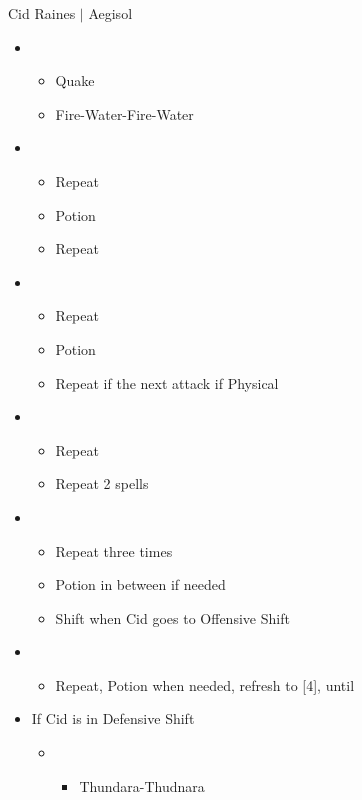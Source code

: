 \begin{battle}{Cid Raines $|$ Aegisol}
\begin{multicols}{2}
\begin{itemize}
    \item \first
    \begin{itemize}
        \item Quake
        \item Fire-Water-Fire-Water
    \end{itemize}
    \item \third
    \begin{itemize}
        \item Repeat
        \item Potion
        \item Repeat
    \end{itemize}
    \item \fourth
    \begin{itemize}
        \item Repeat
        \item Potion
        \item Repeat if the next attack if Physical
    \end{itemize}
    \item \fifth
    \begin{itemize}
        \item Repeat
        \item Repeat 2 spells
    \end{itemize}
    \item \second
    \begin{itemize}
        \item Repeat three times
        \item Potion in between if needed
        \item Shift when Cid goes to Offensive Shift
    \end{itemize}
    \item \third
    \begin{itemize}
        \item Repeat, Potion when needed, refresh to [4], until \stagger
    \end{itemize}
    \item If Cid is in Defensive Shift
    \begin{itemize}
        \item \second
        \begin{itemize}
            \item Thundara-Thudnara

\end{itemize}
\end{itemize}
\end{itemize}
\end{multicols}
\end{battle}

